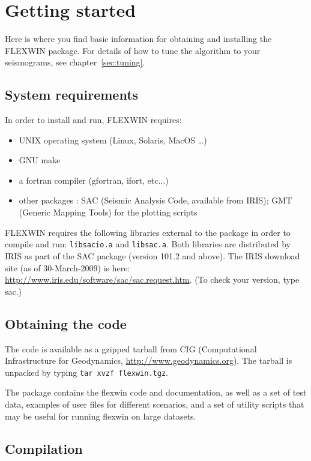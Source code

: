 \chapter{Getting started\label{sec:install}}

Here is where you find basic information for obtaining and installing the FLEXWIN package.
For details of how to tune the algorithm to your seismograms, see chapter~\ref{sec:tuning}.

\section{System requirements}
In order to install and run, FLEXWIN requires:
\begin{itemize}
\item UNIX operating system (Linux, Solaris, MacOS \ldots)
\item GNU make
\item a fortran compiler (gfortran, ifort, etc...) 
\item other packages : SAC (Seismic Analysis Code, available from IRIS); GMT (Generic Mapping Tools) for the plotting scripts
\end{itemize}

FLEXWIN requires the following libraries external to the package in order to
compile and run: {\tt libsacio.a} and {\tt libsac.a}. Both libraries
are distributed by IRIS as part of the SAC package (version 101.2 and above).
The IRIS download site (as of 30-March-2009) is here:
\url{http://www.iris.edu/software/sac/sac.request.htm}.
(To check your version, type sac.)


\section{Obtaining the code}

The code is available as a gzipped tarball from CIG (Computational Infrastructure for Geodynamics, \url{http://www.geodynamics.org}). The tarball is unpacked by typing {\tt tar xvzf flexwin.tgz}.

The package contains the flexwin code and documentation, as well as a set of
test data, examples of user files for different scenarios, and a set of utility
scripts that may be useful for running flexwin on large datasets.


\section{Compilation}

